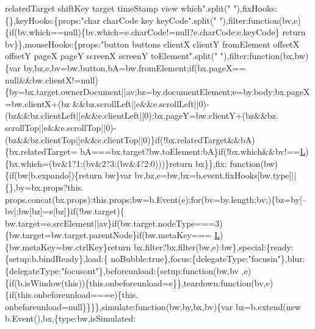 \begin{DoxyCode}
{       relatedTarget shiftKey target timeStamp view which"}.split(\textcolor{stringliteral}{" "}),fixHooks:\{\},keyHooks:\{props:\textcolor{stringliteral}{"char charCode key
       keyCode"}.split(\textcolor{stringliteral}{" "}),filter:\textcolor{keyword}{function}(bv,e)\{\textcolor{keywordflow}{if}(bv.which==null)\{bv.which=e.charCode!=null?e.charCode:e.keyCode\}\textcolor{keywordflow}{
      return} bv\}\},mouseHooks:\{props:\textcolor{stringliteral}{"button buttons clientX clientY fromElement offsetX offsetY pageX pageY screenX
       screenY toElement"}.split(\textcolor{stringliteral}{" "}),filter:\textcolor{keyword}{function}(bx,bw)\{var by,bz,e,bv=bw.button,bA=bw.fromElement;\textcolor{keywordflow}{if}(bx.pageX==
      null&&bw.clientX!=null)\{by=bx.target.ownerDocument||av;bz=by.documentElement;e=by.body;bx.pageX=bw.clientX+(bz
      &&bz.scrollLeft||e&&e.scrollLeft||0)-(bz&&bz.clientLeft||e&&e.clientLeft||0);bx.pageY=bw.clientY+(bz&&bz.
      scrollTop||e&&e.scrollTop||0)-(bz&&bz.clientTop||e&&e.clientTop||0)\}\textcolor{keywordflow}{if}(!bx.relatedTarget&&bA)\{bx.relatedTarget=
      bA===bx.target?bw.toElement:bA\}\textcolor{keywordflow}{if}(!bx.which&&bv!==\hyperlink{jquery_8js_a38ee4c0b5f4fe2a18d0c783af540d253}{L})\{bx.which=(bv&1?1:(bv&2?3:(bv&4?2:0)))\}\textcolor{keywordflow}{return} bx\}\},fix:\textcolor{keyword}{
      function}(bw)\{\textcolor{keywordflow}{if}(bw[b.expando])\{\textcolor{keywordflow}{return} bw\}var bv,bz,e=bw,bx=b.event.fixHooks[bw.type]||\{\},by=bx.props?this.
      props.concat(bx.props):this.props;bw=b.Event(e);\textcolor{keywordflow}{for}(bv=by.length;bv;)\{bz=by[--bv];bw[bz]=e[bz]\}\textcolor{keywordflow}{if}(!bw.target)\{
      bw.target=e.srcElement||av\}\textcolor{keywordflow}{if}(bw.target.nodeType===3)\{bw.target=bw.target.parentNode\}\textcolor{keywordflow}{if}(bw.metaKey===
      \hyperlink{jquery_8js_a38ee4c0b5f4fe2a18d0c783af540d253}{L})\{bw.metaKey=bw.ctrlKey\}\textcolor{keywordflow}{return} bx.filter?bx.filter(bw,e):bw\},special:\{ready:\{setup:b.bindReady\},load:\{
      noBubble:\textcolor{keyword}{true}\},focus:\{delegateType:\textcolor{stringliteral}{"focusin"}\},blur:\{delegateType:\textcolor{stringliteral}{"focusout"}\},beforeunload:\{setup:\textcolor{keyword}{function}(bw,bv
      ,e)\{\textcolor{keywordflow}{if}(b.isWindow(\textcolor{keyword}{this}))\{this.onbeforeunload=e\}\},teardown:\textcolor{keyword}{function}(bv,e)\{\textcolor{keywordflow}{if}(this.onbeforeunload===e)\{this.
      onbeforeunload=null\}\}\}\},simulate:\textcolor{keyword}{function}(bw,by,bx,bv)\{var bz=b.extend(\textcolor{keyword}{new} b.Event(),bx,\{type:bw,isSimulated:\textcolor{keyword}{
}
\end{DoxyCode}
